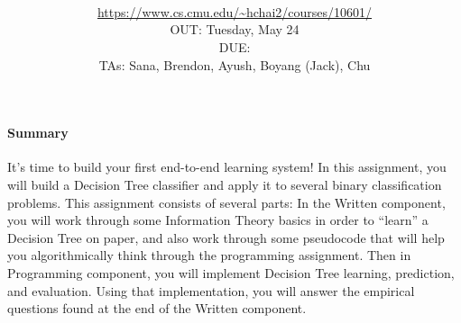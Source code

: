 \documentclass[11pt,addpoints,answers]{exam}
\title{\textsc{\hwName}
} %
\author{\courseName\\
\url{https://www.cs.cmu.edu/~hchai2/courses/10601/} \\
OUT: Tuesday, May 24 \\
DUE: \dueDate{} \\ 
TAs: Sana, Brendon, Ayush, Boyang (Jack), Chu
}
\date{}
\date{}
\begin{document}
\maketitle

\begin{notebox}
\paragraph{Summary} It's time to build your first end-to-end learning system! In this assignment, you will build a Decision Tree classifier and apply it to several binary classification problems. This assignment consists of several parts: In the Written component, you will work through some Information Theory basics in order to ``learn'' a Decision Tree on paper, and also work through some pseudocode that will help you algorithmically think through the programming assignment. Then in Programming component, you will implement Decision Tree learning, prediction, and evaluation. Using that implementation, you will answer the empirical questions found at the end of the Written component.
\end{notebox}
\newcommand \maxsubs {10 }
\end{document}
